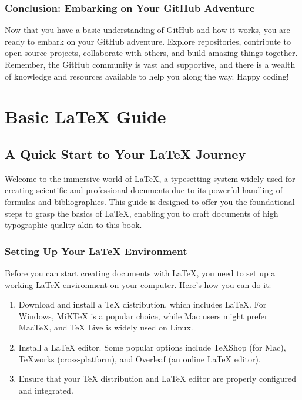 \documentclass{book}
\begin{document}
\subsection*{Conclusion: Embarking on Your GitHub Adventure}

Now that you have a basic understanding of GitHub and how it works, you are ready to embark on your GitHub adventure. Explore repositories, contribute to open-source projects, collaborate with others, and build amazing things together. Remember, the GitHub community is vast and supportive, and there is a wealth of knowledge and resources available to help you along the way. Happy coding!

\chapter{Basic LaTeX Guide}
\section*{A Quick Start to Your LaTeX Journey}

Welcome to the immersive world of LaTeX, a typesetting system widely used for creating scientific and professional documents due to its powerful handling of formulas and bibliographies. This guide is designed to offer you the foundational steps to grasp the basics of LaTeX, enabling you to craft documents of high typographic quality akin to this book.

\subsection*{Setting Up Your LaTeX Environment}

Before you can start creating documents with LaTeX, you need to set up a working LaTeX environment on your computer. Here's how you can do it:

\begin{enumerate}
    \item Download and install a TeX distribution, which includes LaTeX. For Windows, MiKTeX is a popular choice, while Mac users might prefer MacTeX, and TeX Live is widely used on Linux.
    \item Install a LaTeX editor. Some popular options include TeXShop (for Mac), TeXworks (cross-platform), and Overleaf (an online LaTeX editor).
    \item Ensure that your TeX distribution and LaTeX editor are properly configured and integrated.
\end{enumerate}
\end{document}
